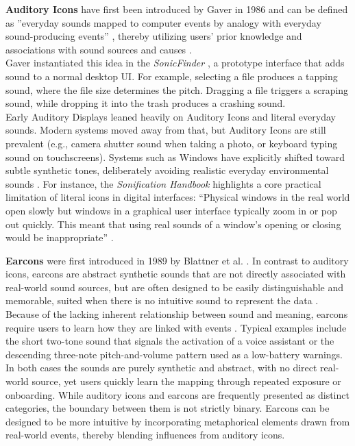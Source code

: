 \textbf{Auditory Icons} have first been introduced by Gaver in 1986 \cite{Gaver_86_IntroducedAuditoryIcons} and can be defined as ''everyday sounds mapped to computer events by analogy with everyday sound-producing events'' \cite{Gaver_93_AuditoryIcons},
thereby utilizing users' prior knowledge and associations with sound sources and causes \cite{Dingler_08_AuditoryDisplayTypesOverview}.\\
Gaver instantiated this idea in the \textit{SonicFinder} \cite{Gaver_89_SonicFinderUsingIcons}, a prototype interface that adds sound to a normal desktop UI.
For example, selecting a file produces a tapping sound, where the file size determines the pitch. Dragging a file triggers a scraping sound, while dropping it into the trash produces a crashing sound.\\
Early Auditory Displays leaned heavily on Auditory Icons and literal everyday sounds. 
Modern systems moved away from that, but Auditory Icons are still prevalent (e.g., camera shutter sound when taking a photo, or keyboard typing sound on touchscreens). Systems such as Windows have explicitly shifted toward subtle synthetic tones, deliberately avoiding realistic everyday environmental sounds \cite{URL_WindowsSounds}. 
For instance, the \textit{Sonification Handbook} highlights a core practical limitation of literal icons in digital interfaces: ``Physical windows in the real world open slowly but windows in a graphical user interface typically zoom in or pop out quickly. This meant that using real sounds of a window’s opening or closing would be inappropriate'' \cite{Hermann_11_SonificationHandbook}.

\textbf{Earcons} were first introduced in 1989 by Blattner et al. \cite{Blattner_89_EarconsAndIcons}. In contrast to auditory icons, earcons are abstract synthetic sounds that are not directly associated with real-world sound sources, but are often designed to be easily distinguishable and memorable, suited when there is no intuitive sound to represent the data \cite{Mcgookin_04_ExplainAuditoryDisplaysWiki}.
Because of the lacking inherent relationship between sound and meaning, earcons require users to learn how they are linked with events \cite{Hermann_11_SonificationHandbook}. Typical examples include the short two-tone sound that signals the activation of a voice assistant or the descending three-note pitch-and-volume pattern used as a low-battery warnings. In both cases the sounds are purely synthetic and abstract, with no direct real-world source, yet users quickly learn the mapping through repeated exposure or onboarding.
While auditory icons and earcons are frequently presented as distinct categories, the boundary between them is not strictly binary. Earcons can be designed to be more intuitive by incorporating metaphorical elements drawn from real-world events, thereby blending influences from auditory icons.

